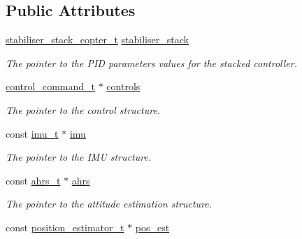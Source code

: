 \subsection*{Public Attributes}
\begin{DoxyCompactItemize}
\item 
\hypertarget{structstabilise__copter__t_a36d952fd06f4391d1241e509a64661fe}{\hyperlink{structstabiliser__stack__copter__t}{stabiliser\+\_\+stack\+\_\+copter\+\_\+t} \hyperlink{structstabilise__copter__t_a36d952fd06f4391d1241e509a64661fe}{stabiliser\+\_\+stack}}\label{structstabilise__copter__t_a36d952fd06f4391d1241e509a64661fe}

\begin{DoxyCompactList}\small\item\em The pointer to the P\+I\+D parameters values for the stacked controller. \end{DoxyCompactList}\item 
\hypertarget{structstabilise__copter__t_ae2eb533eb6b1c70ef15fb0017a0dfb38}{\hyperlink{structcontrol__command__t}{control\+\_\+command\+\_\+t} $\ast$ \hyperlink{structstabilise__copter__t_ae2eb533eb6b1c70ef15fb0017a0dfb38}{controls}}\label{structstabilise__copter__t_ae2eb533eb6b1c70ef15fb0017a0dfb38}

\begin{DoxyCompactList}\small\item\em The pointer to the control structure. \end{DoxyCompactList}\item 
\hypertarget{structstabilise__copter__t_a1b101903d014488e4246e1d8c7e24bc7}{const \hyperlink{structimu__t}{imu\+\_\+t} $\ast$ \hyperlink{structstabilise__copter__t_a1b101903d014488e4246e1d8c7e24bc7}{imu}}\label{structstabilise__copter__t_a1b101903d014488e4246e1d8c7e24bc7}

\begin{DoxyCompactList}\small\item\em The pointer to the I\+M\+U structure. \end{DoxyCompactList}\item 
\hypertarget{structstabilise__copter__t_a26da939666c6b066f3c3ec1c10d9487b}{const \hyperlink{structahrs__t}{ahrs\+\_\+t} $\ast$ \hyperlink{structstabilise__copter__t_a26da939666c6b066f3c3ec1c10d9487b}{ahrs}}\label{structstabilise__copter__t_a26da939666c6b066f3c3ec1c10d9487b}

\begin{DoxyCompactList}\small\item\em The pointer to the attitude estimation structure. \end{DoxyCompactList}\item 
\hypertarget{structstabilise__copter__t_a651289af56035f07abe8e144bbd0123b}{const \hyperlink{structposition__estimator__t}{position\+\_\+estimator\+\_\+t} $\ast$ \hyperlink{structstabilise__copter__t_a651289af56035f07abe8e144bbd0123b}{pos\+\_\+est}}\label{structstabilise__copter__t_a651289af56035f07abe8e144bbd0123b}


\end{DoxyCompactItemize}
